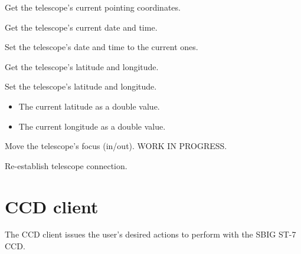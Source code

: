\documentclass[a4paper,english]{article}
\begin{document}
\begin{Description}
	   
	
\item[\Arg{gettelradec}] Get the telescope's current pointing coordinates.

	   
	
\item[\Arg{getdatetime}] Get the telescope's current date and time.

	   
	
\item[\Arg{setdatetime}] Set the telescope's date and time to the current ones.

	   
	
\item[\Arg{getlatlon}] Get the telescope's latitude and longitude.

	   
	
\item[\Arg{setlatlon}] Set the telescope's latitude and longitude.

	     
	
	\begin{itemize}
		\item {} The current latitude as a double value.
		\item {} The current longitude as a double value.
	\end{itemize}
	
\item[\Arg{focus}] Move the telescope's focus (in/out). WORK IN PROGRESS.

\item[\Arg{reconnect}] Re-establish telescope connection.

	   
	
\end{Description}


\section{CCD client}

The CCD client issues the user's desired actions to perform with the SBIG ST-7 CCD. \\
\end{document}
